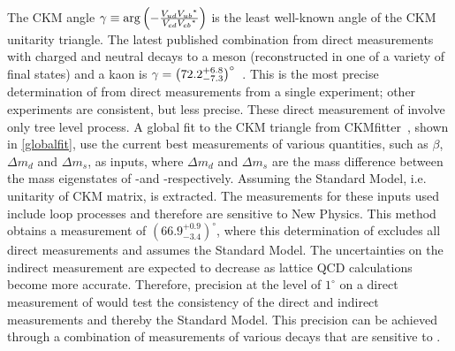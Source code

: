 The CKM angle $\gamma \equiv \arg\left(-\frac{{V_{{u}{d}}}{{V_{{u}{b}}}}^*}{{V_{{c}{d}}}{{V_{{c}{b}}}}^*}\right)$ is the least well-known angle of the CKM unitarity triangle. The latest published \lhcb combination from direct measurements with charged and neutral \B decays to a \D meson (reconstructed in one of a variety of final states) and a kaon is $\gamma = \left(72.2^{+6.8}_{-7.3}\right)^{\circ}$~\cite{LHCb-PAPER-2016-032}. This is the most precise determination of \Pgamma from direct measurements from a single experiment; other experiments are consistent, but less precise. These direct measurement of \Pgamma involve only tree level process. A global fit to the CKM triangle from CKMfitter~\cite{CKMFitter}, shown in \fig\ref{globalfit}, use the current best measurements of various quantities, such as $\beta$, $\Delta m_d$ and $\Delta m_s$, as inputs, where $\Delta m_d$ and $\Delta m_s$ are the mass difference between the mass eigenstates of \Bz-\Bzb and \Bs-\Bsb respectively. Assuming the Standard Model, i.e. unitarity of CKM matrix, \Pgamma is extracted. The measurements for these inputs used include loop processes and therefore are sensitive to New Physics. This method obtains a \Pgamma measurement of $(66.9^{+0.9}_{-3.4})^{\circ}$, where this determination of \Pgamma excludes all direct measurements and assumes the Standard Model. The uncertainties on the indirect measurement are expected to decrease as lattice QCD calculations become more accurate. Therefore, precision at the level of $1^\circ$ on a direct measurement of \Pgamma would test the consistency of the direct and indirect measurements and thereby the Standard Model. This precision can be achieved through a combination of measurements of various \B decays that are sensitive to \Pgamma.

